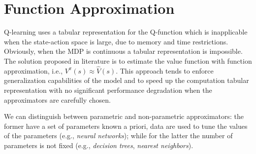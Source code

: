 \section{Function Approximation} \label{sec:function_approximation}
Q-learning uses a tabular representation for the Q-function which is inapplicable when the state-action space is large, due to memory and time restrictions. Obviously, when the MDP is continuous a tabular representation is impossible. The solution proposed in literature is to estimate the value function with function approximation, i.e., $V^\pi(s) \approx \hat{V}(s)$. This approach tends to enforce generalization capabilities of the model and to speed up the computation \wrt tabular representation with no significant performance degradation when the approximators are carefully chosen.\par 
We can distinguish between parametric and non-parametric approximators: the former have a set of parameters known a priori, data are used to tune the values of the parameters (e.g., \emph{neural networks}); while for the latter the number of parameters is not fixed (e.g., \emph{decision trees}, \emph{nearest neighbors}).
